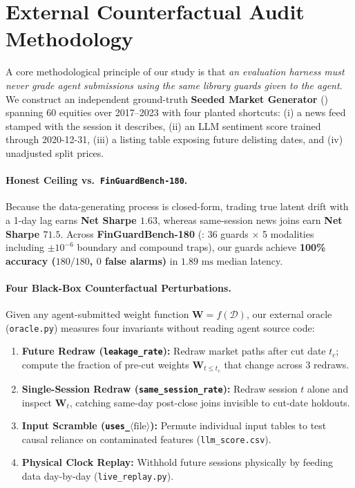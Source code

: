 \section{External Counterfactual Audit Methodology}
\label{sec:method}

A core methodological principle of our study is that \emph{an evaluation harness must never grade agent submissions using the same library guards given to the agent}. We construct an independent ground-truth \textbf{Seeded Market Generator} () spanning 60 equities over 2017--2023 with four planted shortcuts: (i) a news feed stamped with the session it describes, (ii) an LLM sentiment score trained through 2020-12-31, (iii) a listing table exposing future delisting dates, and (iv) unadjusted split prices.

\paragraph{Honest Ceiling vs.\ \texttt{FinGuardBench-180}.}
Because the data-generating process is closed-form, trading true latent drift with a 1-day lag earns \textbf{Net Sharpe $1.63$}, whereas same-session news joins earn \textbf{Net Sharpe $71.5$}. Across \textbf{FinGuardBench-180} (: 36 guards $\times$ 5 modalities including $\pm 10^{-6}$ boundary and compound traps), our guards achieve \textbf{100\% accuracy ($180/180$, $0$ false alarms)} in $1.89\text{ ms}$ median latency.

\paragraph{Four Black-Box Counterfactual Perturbations.}
Given any agent-submitted weight function $\mathbf{W} = f(\mathcal{D})$, our external oracle (\texttt{oracle.py}) measures four invariants without reading agent source code:
\begin{enumerate}
    \item \textbf{Future Redraw (\texttt{leakage\_\allowbreak rate}):} Redraw market paths after cut date $t_c$; compute the fraction of pre-cut weights $\mathbf{W}_{t \le t_c}$ that change across 3 redraws.
    \item \textbf{Single-Session Redraw (\texttt{same\_\allowbreak session\_\allowbreak rate}):} Redraw session $t$ alone and inspect $\mathbf{W}_t$, catching same-day post-close joins invisible to cut-date holdouts.
    \item \textbf{Input Scramble (\texttt{uses\_}$\langle\text{file}\rangle$):} Permute individual input tables to test causal reliance on contaminated features (\texttt{llm\_\allowbreak score.csv}).
    \item \textbf{Physical Clock Replay:} Withhold future sessions physically by feeding data day-by-day (\texttt{live\_\allowbreak replay.py}).
\end{enumerate}

